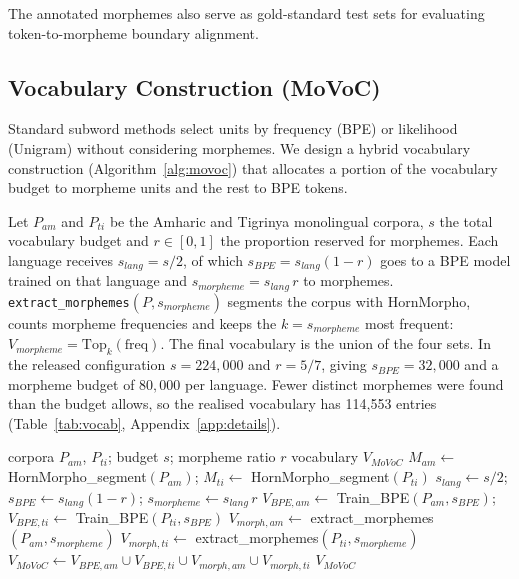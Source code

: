 \documentclass[11pt]{article}
\newcommand{\movoctok}{MoVoC-Tok}
\begin{document}
\begin{table}[t]
  \centering
  
  \caption{Segmentations produced by the released tokenizers (32k
  vocabularies) for the example words of the published Table~1 and
  Section~7. Amharic words use the Amharic \movoctok{}, the Tigrinya word the
  Tigrinya \movoctok{}. ``Gold'' is the surface segmentation in the evaluation
  set where the word occurs in it (``--'': not in the evaluation set).
  Generated by \texttt{make\_correction\_tables.py}.}
  \label{tab:segmentation}
\end{table}

The annotated morphemes also serve as gold-standard test sets for evaluating
token-to-morpheme boundary alignment.

\subsection{Vocabulary Construction (MoVoC)}
\label{sec:movoc}

Standard subword methods select units by frequency (BPE) or likelihood
(Unigram) without considering morphemes. We design a hybrid vocabulary
construction (Algorithm~\ref{alg:movoc}) that allocates a portion of the
vocabulary budget to morpheme units and the rest to BPE tokens.

Let $P_{am}$ and $P_{ti}$ be the Amharic and Tigrinya monolingual corpora,
$s$ the total vocabulary budget and $r \in [0,1]$ the proportion reserved for
morphemes. Each language receives $s_{lang} = s/2$, of which
$s_{BPE} = s_{lang}(1-r)$ goes to a BPE model trained on that language and
$s_{morpheme} = s_{lang}\,r$ to morphemes.
\texttt{extract\_morphemes}$(P, s_{morpheme})$ segments the corpus with
HornMorpho, counts morpheme frequencies and keeps the
$k = s_{morpheme}$ most frequent: $V_{morpheme} = \mathrm{Top}_k(\mathrm{freq})$.
The final vocabulary is the union of the four sets. In the released
configuration $s = 224{,}000$ and $r = 5/7$, giving $s_{BPE} = 32{,}000$ and a
morpheme budget of $80{,}000$ per language. Fewer distinct morphemes were
found than the budget allows, so the realised vocabulary has 114,553 entries
(Table~\ref{tab:vocab}, Appendix~\ref{app:details}).

\begin{algorithm}[t]
\caption{MoVoC vocabulary construction}
\label{alg:movoc}
\small
\begin{algorithmic}[1]
\Require corpora $P_{am}$, $P_{ti}$; budget $s$; morpheme ratio $r$
\Ensure vocabulary $V_{MoVoC}$
\State $M_{am} \gets$ HornMorpho\_segment$(P_{am})$; $M_{ti} \gets$ HornMorpho\_segment$(P_{ti})$
\State $s_{lang} \gets s/2$; $s_{BPE} \gets s_{lang}(1-r)$; $s_{morpheme} \gets s_{lang}\, r$
\State $V_{BPE,am} \gets$ Train\_BPE$(P_{am}, s_{BPE})$; $V_{BPE,ti} \gets$ Train\_BPE$(P_{ti}, s_{BPE})$
\State $V_{morph,am} \gets$ extract\_morphemes$(P_{am}, s_{morpheme})$
\State $V_{morph,ti} \gets$ extract\_morphemes$(P_{ti}, s_{morpheme})$
\State $V_{MoVoC} \gets V_{BPE,am} \cup V_{BPE,ti} \cup V_{morph,am} \cup V_{morph,ti}$
\State \Return $V_{MoVoC}$
\end{algorithmic}
\end{algorithm}
\end{document}
